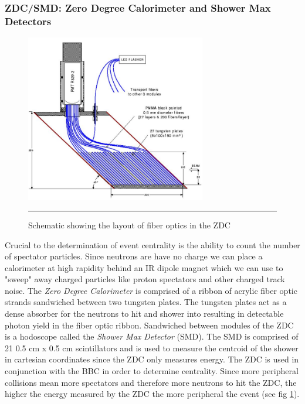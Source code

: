 \subsubsection{ZDC/SMD: Zero Degree Calorimeter and Shower Max Detectors}

\begin{figure}[h!]
  \centering
    \includegraphics[width=0.7\textwidth]{Figures/ZDCschematic.JPG}
    \rule{35em}{0.7pt}
  \caption[Schematic showing the layout of fiber optics in the ZDC]{Schematic showing the layout of fiber optics in the ZDC}
  \label{fig:zdcvsbbc}
\end{figure}

Crucial to the determination of event centrality is the ability to count the number of spectator particles. Since neutrons are have no charge we can place a calorimeter at high rapidity behind an IR dipole magnet which we can use to "sweep" away charged particles like proton spectators and other charged track noise. The \textit{Zero Degree Calorimeter}\citep{ZDCfocus} is comprised of a ribbon of acrylic fiber optic strands sandwiched between two tungsten plates. The tungsten plates act as a dense absorber for the neutrons to hit and shower into resulting in detectable photon yield in the fiber optic ribbon. Sandwiched between modules of the ZDC is a hodoscope called the \textit{Shower Max Detector} (SMD). The SMD is comprised of 21 0.5 cm x 0.5 cm scintillators and is used to measure the centroid of the shower in cartesian coordinates since the ZDC only measures energy\citep{phenixzdc}. The ZDC is used in conjunction with the BBC in order to determine centrality. Since more peripheral collisions mean more spectators and therefore more neutrons to hit the ZDC, the higher the energy measured by the ZDC the more peripheral the event (see fig \ref{fig:zdcvsbbc}\citep{Ghosh2001}).


